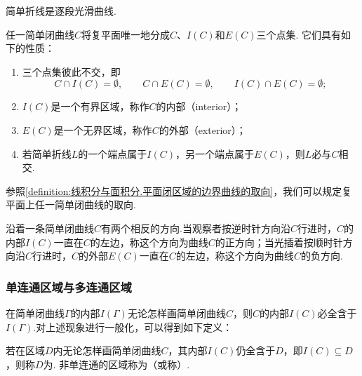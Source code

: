 \begin{example}
简单折线是逐段光滑曲线.
\end{example}

\begin{theorem}[若尔当定理]
任一简单闭曲线\(C\)将复平面唯一地分成\(C\)、\(I(C)\)和\(E(C)\)三个点集.
它们具有如下的性质：\begin{enumerate}
\item 三个点集彼此不交，即\[
C \cap I(C) = \emptyset,
\qquad
C \cap E(C) = \emptyset,
\qquad
I(C) \cap E(C) = \emptyset;
\]
\item \(I(C)\)是一个有界区域，称作\(C\)的内部（interior）；
\item \(E(C)\)是一个无界区域，称作\(C\)的外部（exterior）；
\item 若简单折线\(L\)的一个端点属于\(I(C)\)，另一个端点属于\(E(C)\)，则\(L\)必与\(C\)相交.
\end{enumerate}
\end{theorem}

参照\cref{definition:线积分与面积分.平面闭区域的边界曲线的取向}，我们可以规定复平面上任一简单闭曲线的取向.
\begin{definition}
沿着一条简单闭曲线\(C\)有两个相反的方向.当观察者按逆时针方向沿\(C\)行进时，\(C\)的内部\(I(C)\)一直在\(C\)的左边，称这个方向为曲线\(C\)的正方向；当光插着按顺时针方向沿\(C\)行进时，\(C\)的外部\(E(C)\)一直在\(C\)的左边，称这个方向为曲线\(C\)的负方向.
\end{definition}

\subsubsection{单连通区域与多连通区域}
在简单闭曲线\(\Gamma\)的内部\(I(\Gamma)\)无论怎样画简单闭曲线\(C\)，则\(C\)的内部\(I(C)\)必全含于\(I(\Gamma)\).对上述现象进行一般化，可以得到如下定义：
\begin{definition}
若在区域\(D\)内无论怎样画简单闭曲线\(C\)，其内部\(I(C)\)仍全含于\(D\)，即\(I(C) \subseteq D\)，则称\(D\)为.
非单连通的区域称为（或称）.
\end{definition}

